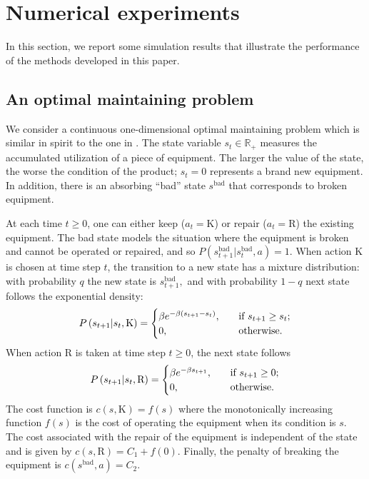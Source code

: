\documentclass[12pt,technote,onecolumn]{IEEEtran}
\begin{document}
\section{Numerical experiments}\label{sec7}

In this section, we report some simulation results that illustrate
the performance of the methods developed in this paper. 


\subsection{An optimal maintaining problem}

We consider a continuous one-dimensional optimal maintaining problem
which is similar in spirit to the one in \cite{munos2008finite}.
The state variable $s_{t}\in\mathbb{R}_{+}$ measures the accumulated
utilization of a piece of equipment. The larger the value of the state,
the worse the condition of the product; $s_{t}=0$ represents a brand
new equipment. In addition, there is an absorbing ``bad'' state
$s^{\text{bad}}$ that corresponds to broken equipment. 

At each time $t\geq0$, one can either keep ($a_{t}=\text{K}$) or repair
($a_{t}=\text{R}$) the existing equipment. The bad state models the situation
where the equipment is broken and cannot be operated or repaired,
and so $P(s_{t+1}^{\text{bad}}|s_{t}^{\text{bad}},a)=1$. When action
$\text{K}$ is chosen at time step $t$, the transition to a new state has
a mixture distribution: with probability $q$ the new state is $s_{t+1}^{\text{bad}},$
and with probability $1-q$ next state follows the exponential density:
\[
P\left(s_{t+1}|s_{t},\text{K}\right)=\begin{cases}
\beta e^{-\beta\left(s_{t+1}-s_{t}\right)}, \quad& \text{if}\,\,\mbox{\ensuremath{s_{t+1}\geq s_{t}};}\\
0, \quad& \text{otherwise.}
\end{cases}
\]
When action $\text{R}$ is taken at time step $t\geq0$, the next state follows
\[
P\left(s_{t+1}|s_{t},\text{R}\right)=\begin{cases}
\beta e^{-\beta s_{t+1}}, \quad& \text{if}\,\,\mbox{\ensuremath{s_{t+1}\geq0};}\\
0, \quad& \text{otherwise.}
\end{cases}
\]
The cost function is $c(s,\text{K})=f(s)$ where
the monotonically increasing function $f\left(s\right)$ is the cost
of operating the equipment when its condition is $s$. The cost associated
with the repair of the equipment is independent of the state and is
given by $c(s,\text{R})=C_{1}+f(0).$ Finally, the
penalty of breaking the equipment is $c(s^{\text{bad}},a)=C_{2}.$ 
\end{document}
